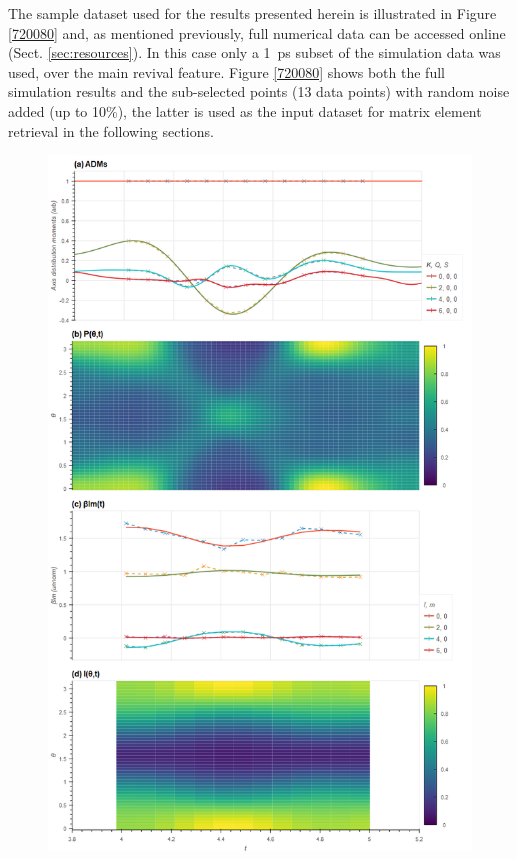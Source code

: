\documentclass[10pt]{article}
\begin{document}
The sample dataset used for the results presented herein is illustrated in Figure \ref{720080} and, as mentioned previously, full numerical data can be accessed online (Sect. \ref{sec:resources}). In this case only a 1~ps subset of the simulation data was used, over the main revival feature. Figure \ref{720080} shows both the full simulation results and the sub-selected points (13 data points) with random noise added (up to 10\%), the latter is used as the input dataset for matrix element retrieval in the following sections. %




\begin{figure}[]
\begin{center}
\includegraphics[width=\textwidth,height=\dimexpr\textheight-4\baselineskip-\abovecaptionskip-\belowcaptionskip\relax,keepaspectratio]{figures/dataDump_1000fitTests_multiFit_noise_051021_data4up_290722_11-00-33.png}

\end{center}
\end{figure}
\end{document}

